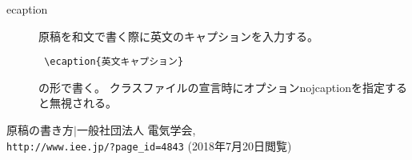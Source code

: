 \documentclass[platex,fleqn]{ieej-tec2}%
\newcommand{\bs}{\texttt{\symbol{'134}}}
\begin{document}
\begin{description}
\item[\bs ecaption]
原稿を和文で書く際に英文のキャプションを入力する。
\begin{verbatim}
 \ecaption{英文キャプション}
\end{verbatim}
の形で書く。
クラスファイルの宣言時にオプションnojcaptionを指定すると無視される。

\end{description}


\begin{thebibliography}{99}
原稿の書き方$\mid$一般社団法人 電気学会, \\
\verb|http://www.iee.jp/?page_id=4843| (2018年7月20日閲覧)
\end{thebibliography}
\end{document}
